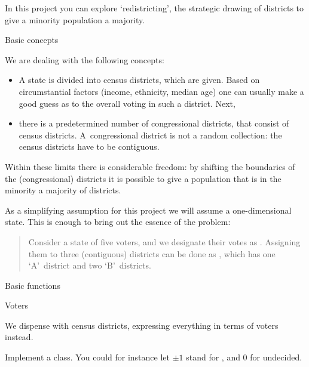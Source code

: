 
In this project you can explore `redistricting', the strategic drawing
of districts to give a minority population a majority.

 {Basic concepts}

We are dealing with the following concepts:
\begin{itemize}
\item A state is divided into census districts, which are given. Based
  on circumstantial factors (income, ethnicity, median age) one can
  usually make a good guess as to the overall voting in such a
  district. Next,
\item there is a predetermined number of congressional districts, that
  consist of census districts. A~congressional district is not a
  random collection: the census districts have to be contiguous.
\end{itemize}
Within these limits there is considerable freedom: by shifting the
boundaries of the (congressional) districts it is possible to give a
population that is in the minority a majority of districts.

As a simplifying assumption for this project we will assume a
one-dimensional state. This is enough to bring out the essence of the problem:
\begin{quotation}
  Consider a state of five voters, and we designate their votes as
  . Assigning them to three (contiguous) districts can be
  done as , which has one `A'~district and two
  `B'~districts.
\end{quotation}

 {Basic functions}

 {Voters}

We dispense with census districts, expressing everything in terms of
voters instead.

\begin{exercise}
  Implement a  class. You could for instance let $\pm1$ stand
  for , and 0 for undecided.
\end{exercise}

